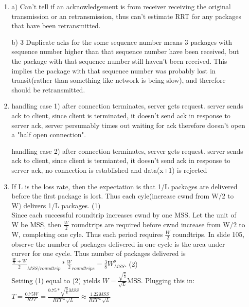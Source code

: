\documentclass[12pt]{article}
\begin{document}
\begin{enumerate}
	\item
		a) Can't tell if an acknowledgement is from receiver receiving the original transmission or 
		an retransmission, thus can't estimate RRT for any packages that have been retransmitted.

		b) 3 Duplicate acks for the some sequence number means 3 packages with sequence number
		higher than that sequence number have been received, but the package with that sequence number 
		still haven't been received.  This implies the package with that sequence number was probably 
		lost in transit(rather than something like network is being slow), and therefore should be retransmitted.

	\item
		handling case 1) after connection terminates, server gets request. server sends ack to client, 
		since client is terminated, it doesn't send ack in response to server ack, server persumably times 
		out waiting for ack therefore doesn't open a "half open connection".

		handling case 2) after connection terminates, server gets request. server sends ack to client,
		since client is termianted, it doesn't send ack in response to server ack, no connection is
		established and data(x+1) is rejected

	\item
		If L is the loss rate, then the expectation is that 1/L packages are delivered before the first
		package is lost. Thus each cyle(increase cwnd from W/2 to W) delivers 1/L packages. (1)\\
		
		Since each successful roundtrip increases cwnd by one MSS. Let the unit of W be MSS, then
		$\frac{W}{2}$ roundtrips are required before cwnd increase from W/2 to W, completing one cyle. 
		Thus each period requires $\frac{W}{2}$ roundtrips. In slide 105, observe the number of packages 
		delivered in one cycle is the area under curver for one cycle. Thus number of packages delivered is\\
		$\frac{\frac{W}{2} + W}{2}_{MSS/roundtrip}* \frac{W}{2}_{roundtrips}=\frac{3}{8}W_{MSS}^2 $. (2)\\

		Setting (1) equal to (2) yields $W=\frac{\sqrt{\frac{8}{3}}}{\sqrt{L}}$MSS. Plugging this in: 
		$T=\frac{0.75W}{RTT}=\frac{0.75*\sqrt{\frac{3}{8}}MSS}{RTT*\sqrt{L}} \approx \frac{1.22MSS}{RTT*\sqrt{L}}$
\end{enumerate}
\end{document}
